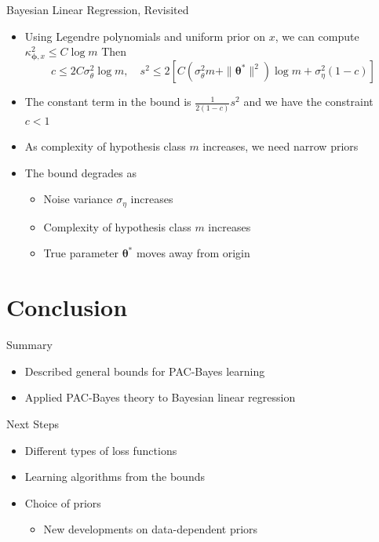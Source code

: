 \documentclass[aspectratio=169]{beamer}
\begin{document}
\begin{frame}{Bayesian Linear Regression, Revisited}
  \begin{itemize}
    \item
      Using Legendre polynomials and uniform prior on $x$, we can compute
      $\kappa_{\bm{\phi},x}^2 \leq C \log m$ Then
      \begin{equation*}
        c \leq 2 C \sigma_\theta^2 \log m, \quad s^2 \leq 2 [C (\sigma_\theta^2
        m + \| \bm{\theta}^* \|^2) \log m + \sigma_\eta^2 (1 - c)]
      \end{equation*}
    \item
      The constant term in the bound is $\frac{1}{2(1 - c)} s^2$ and we have the
      constraint $c < 1$
    \item
      As complexity of hypothesis class $m$ increases, we need narrow priors
    \item
      The bound degrades as
      \begin{itemize}
        \item
          Noise variance $\sigma_\eta$ increases
        \item
          Complexity of hypothesis class $m$ increases
        \item
          True parameter $\bm{\theta}^*$ moves away from origin
      \end{itemize}
  \end{itemize}
\end{frame}

\section{Conclusion}

\begin{frame}{Summary}
	\begin{itemize}
		\item
      Described general bounds for PAC-Bayes learning
    \item
      Applied PAC-Bayes theory to Bayesian linear regression
	\end{itemize}
\end{frame}

\begin{frame}{Next Steps}
  \begin{itemize}
    \item
      Different types of loss functions
    \item
      Learning algorithms from the bounds
    \item
      Choice of priors
      \begin{itemize}
        \item
          New developments on data-dependent priors
      \end{itemize}
  \end{itemize}
\end{frame}
\end{document}
